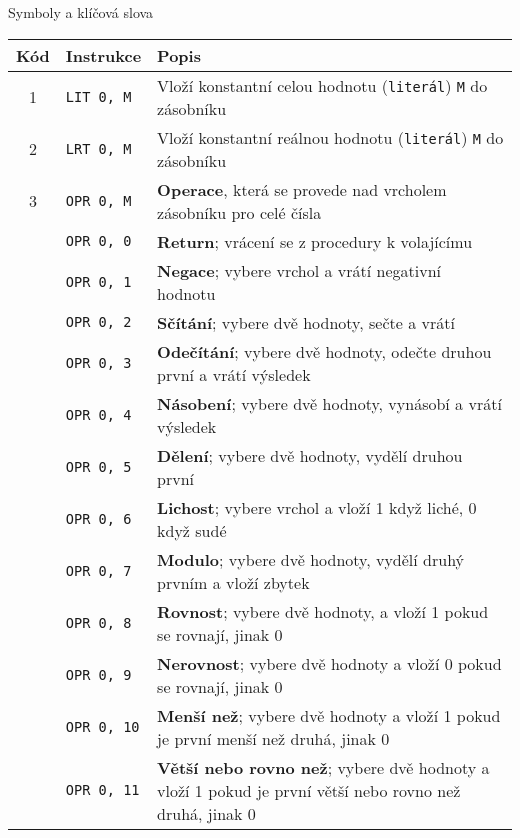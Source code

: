 \documentclass[
12pt,
a4paper,
pdftex,
czech
]{report}
\begin{document}
\begin{table}[]
\centering
\caption{Symboly a klíčová slova}
\label{symboly}
\end{table}
\begin{longtable}{|c|l|p{10cm}|}
\hline
		Kód & Instrukce & Popis \\
\hline\hline
\rule{0pt}{3ex}1 & \texttt{LIT 0, M} & Vloží konstantní celou hodnotu (\texttt{literál}) \texttt{M} do zásobníku \\ \hline
\rule{0pt}{3ex}2 & \texttt{LRT 0, M} & Vloží konstantní reálnou hodnotu (\texttt{literál}) \texttt{M} do zásobníku \\ \hline
\rule{0pt}{3ex}3 & \texttt{OPR 0, M} & \textbf{Operace}, která se provede nad vrcholem zásobníku pro celé čísla \\ \hline
\rule{0pt}{3ex} & \texttt{OPR 0, 0} & \textbf{Return}; vrácení se z procedury k volajícímu \\ \hline
\rule{0pt}{3ex} & \texttt{OPR 0, 1} & \textbf{Negace}; vybere vrchol a vrátí negativní hodnotu \\ \hline
\rule{0pt}{3ex} & \texttt{OPR 0, 2} & \textbf{Sčítání}; vybere dvě hodnoty, sečte a vrátí \\ \hline
\rule{0pt}{3ex} & \texttt{OPR 0, 3} & \textbf{Odečítání}; vybere dvě hodnoty, odečte druhou první a vrátí výsledek \\ \hline
\rule{0pt}{3ex} & \texttt{OPR 0, 4} & \textbf{Násobení}; vybere dvě hodnoty, vynásobí a vrátí výsledek \\ \hline
\rule{0pt}{3ex} & \texttt{OPR 0, 5} & \textbf{Dělení}; vybere dvě hodnoty, vydělí druhou první \\ \hline
\rule{0pt}{3ex} & \texttt{OPR 0, 6} & \textbf{Lichost}; vybere vrchol a vloží 1 když liché, 0 když sudé \\ \hline
\rule{0pt}{3ex} & \texttt{OPR 0, 7} & \textbf{Modulo}; vybere dvě hodnoty, vydělí druhý prvním a vloží zbytek \\ \hline
\rule{0pt}{3ex} & \texttt{OPR 0, 8} & \textbf{Rovnost}; vybere dvě hodnoty, a vloží 1 pokud se rovnají, jinak 0 \\ \hline
\rule{0pt}{3ex} & \texttt{OPR 0, 9} & \textbf{Nerovnost}; vybere dvě hodnoty a vloží 0 pokud se rovnají, jinak 0 \\ \hline
\rule{0pt}{3ex} & \texttt{OPR 0, 10} & \textbf{Menší než}; vybere dvě hodnoty a vloží 1 pokud je první menší než druhá, jinak 0 \\ \hline
\rule{0pt}{3ex} & \texttt{OPR 0, 11} & \textbf{Větší nebo rovno než}; vybere dvě hodnoty a vloží 1 pokud je první větší nebo rovno než druhá, jinak 0 \\ \hline

\end{longtable}
\end{document}

